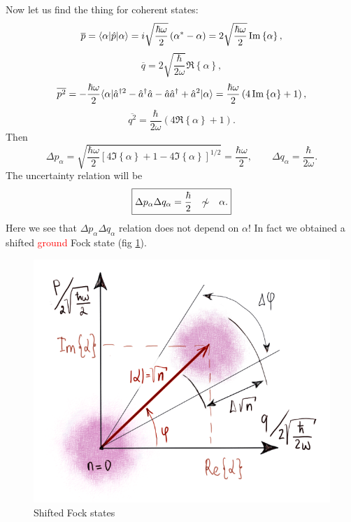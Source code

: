 Now let us find the thing for coherent states:
\begin{equation}
	\overline{p} = \langle\alpha\rvert \hat{p} \lvert\alpha\rangle = i \sqrt{\frac{\hbar \omega}{2}} \left( \alpha^* - \alpha \right) = 2 \sqrt{\frac{\hbar \omega}{2}} \operatorname{Im} \left\{ \alpha \right\},
\end{equation}
\begin{equation}
	\overline{q} = 2 \sqrt{\frac{\hbar }{2\omega}} \Re \left\{\alpha \right\},
\end{equation}
\begin{equation}
	\overline{p^2} = - \frac{\hbar \omega}{2} \langle\alpha\rvert \hat{a}^{\dagger 2} - \hat{a}^{\dagger} \hat{a} - \hat{a} \hat{a}^{\dagger} + \hat{a}^2  \lvert\alpha\rangle = \frac{\hbar \omega}{2} \left( 4 \operatorname{Im} \left\{ \alpha \right\} + 1\right),
\end{equation}
\begin{equation}
	\overline{q^2} = \frac{\hbar}{2 \omega} \left( 4 \Re \left\{ \alpha \right\} + 1\right).
\end{equation}
Then
\begin{equation}
	\Delta p_{\alpha} = \sqrt{\frac{\hbar \omega}{2} \left[ 4 \Im \left\{ \alpha \right\} + 1 - 4 \Im \left\{ \alpha \right\} \right]^{1/2}} = \frac{\hbar \omega}{2}, \qquad \Delta q_{\alpha} = \frac{\hbar}{2 \omega}.
\end{equation}
The uncertainty relation will be
\begin{equation}
	\boxed{\Delta p_{\alpha} \Delta q_{\alpha} = \frac{\hbar}{2} \quad \slashed{\sim} \quad  \alpha.}
\end{equation}
Here we see that $\Delta p_{\alpha} \Delta q_{\alpha}$ relation does not depend on $\alpha$! In fact we obtained a shifted {\textcolor{red}{ground}} Fock state (fig \ref{fig:shifted_Fock}).

\begin{figure}
	\centering
	\includegraphics[width=0.6\linewidth]{fig/L2/shifted_Fock1}
	\caption{Shifted Fock states}
	\label{fig:shifted_Fock}
\end{figure}

